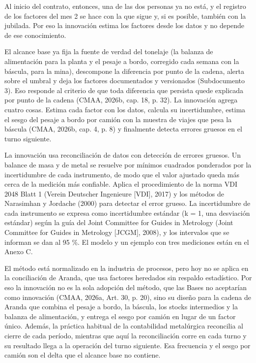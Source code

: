 \documentclass[subdoc]{../../comun/overfore}
\begin{document}
Al inicio del contrato, entonces, una de las dos personas ya no está, y el registro de los factores del mes 2 se hace con la que sigue y, si es posible, también con la jubilada. Por eso la innovación estima los factores desde los datos y no depende de ese conocimiento.

El alcance base ya fija la fuente de verdad del tonelaje (la balanza de alimentación para la planta y el pesaje a bordo, corregido cada semana con la báscula, para la mina), descompone la diferencia por punto de la cadena, alerta sobre el umbral y deja los factores documentados y versionados (Subdocumento 3). Eso responde al criterio de que toda diferencia que persista quede explicada por punto de la cadena (CMAA, 2026b, cap. 18, p. 32). La innovación agrega cuatro cosas. Estima cada factor con los datos, calcula su incertidumbre, estima el sesgo del pesaje a bordo por camión con la muestra de viajes que pesa la báscula (CMAA, 2026b, cap. 4, p. 8) y finalmente detecta errores gruesos en el turno siguiente.

La innovación usa reconciliación de datos con detección de errores gruesos. Un balance de masa y de metal se resuelve por mínimos cuadrados ponderados por la incertidumbre de cada instrumento, de modo que el valor ajustado queda más cerca de la medición más confiable. Aplica el procedimiento de la norma VDI 2048 Blatt 1 (Verein Deutscher Ingenieure [VDI], 2017) y los métodos de Narasimhan y Jordache (2000) para detectar el error grueso. La incertidumbre de cada instrumento se expresa como incertidumbre estándar (k = 1, una desviación estándar) según la guía del Joint Committee for Guides in Metrology (Joint Committee for Guides in Metrology [JCGM], 2008), y los intervalos que se informan se dan al 95 \%. El modelo y un ejemplo con tres mediciones están en el Anexo C.

El método está normalizado en la industria de procesos, pero hoy no se aplica en la conciliación de Aranda, que usa factores heredados sin respaldo estadístico. Por eso la innovación no es la sola adopción del método, que las Bases no aceptarían como innovación (CMAA, 2026a, Art. 30, p. 20), sino su diseño para la cadena de Aranda que combina el pesaje a bordo, la báscula, los stocks intermedios y la balanza de alimentación, y entrega el sesgo por camión en lugar de un factor único. Además, la práctica habitual de la contabilidad metalúrgica reconcilia al cierre de cada período, mientras que aquí la reconciliación corre en cada turno y su resultado llega a la operación del turno siguiente. Esa frecuencia y el sesgo por camión son el delta que el alcance base no contiene.
\end{document}
